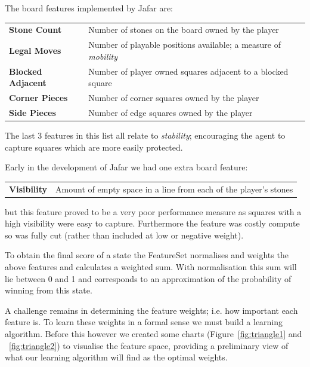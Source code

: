 \documentclass[11pt]{article}
\begin{document}
The board features implemented by Jafar are:
\begin{center}\begin{tabular}{l l}
\textbf{Stone Count} & Number of stones on the board owned by the player\\
\textbf{Legal Moves} & Number of playable positions available; a measure of \emph{mobility}\\
\textbf{Blocked Adjacent} & Number of player owned squares adjacent to a blocked square\\
\textbf{Corner Pieces} & Number of corner squares owned by the player\\
\textbf{Side Pieces} & Number of edge squares owned by the player\\
\end{tabular}\end{center}
The last 3 features in this list all relate to \emph{stability}; encouraging the
agent to capture squares which are more easily protected.

Early in the development of Jafar we had one extra board feature:
\begin{center}\begin{tabular}{l l}
\textbf{Visibility} & Amount of empty space in a line from each of the player's stones\\
\end{tabular}\end{center}
but this feature proved to be a very poor performance measure as squares with a high
visibility were easy to capture. Furthermore the feature was costly compute
so was fully cut (rather than included at low or negative weight).

To obtain the final score of a state the FeatureSet normalises and weights the
above features and calculates a weighted sum. With normalisation this sum will lie
between 0 and 1 and corresponds to an approximation of the probability of winning from this state.

A challenge remains in determining the feature weights; i.e. how important each
feature is. To learn these weights in a formal sense we must build a learning algorithm.
Before this however we created some charts (Figure~\ref{fig:triangle1} and ~\ref{fig:triangle2})
to visualise the feature space, providing a preliminary view of what our learning algorithm will find as the optimal weights.
\end{document}
